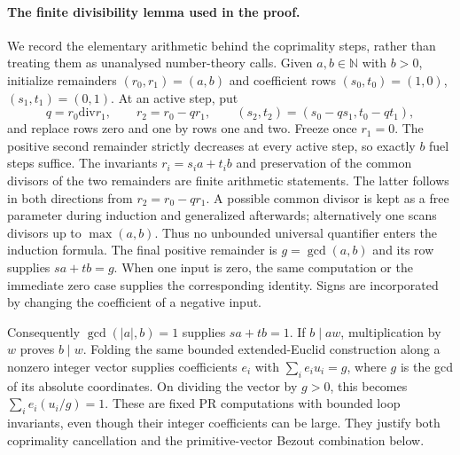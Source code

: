 \paragraph{The finite divisibility lemma used in the proof.}
We record the elementary arithmetic behind the coprimality steps, rather
than treating them as unanalysed number-theory calls. Given $a,b\in\mathbb N$
with $b>0$, initialize remainders $(r_0,r_1)=(a,b)$ and coefficient rows
$(s_0,t_0)=(1,0)$, $(s_1,t_1)=(0,1)$. At an active step, put
\[
 q=r_0\mathbin{\mathrm{div}}r_1,\qquad
 r_2=r_0-q r_1,\qquad
 (s_2,t_2)=(s_0-q s_1,t_0-q t_1),
\]
and replace rows zero and one by rows one and two. Freeze once $r_1=0$.
The positive second remainder strictly decreases at every active step,
so exactly $b$ fuel steps suffice. The invariants
$r_i=s_i a+t_i b$ and preservation of the common divisors of the two
remainders are finite arithmetic statements. The latter follows in both
directions from $r_2=r_0-q r_1$. A possible common divisor is kept as a
free parameter during induction and generalized afterwards; alternatively
one scans divisors up to $\max(a,b)$. Thus no unbounded universal
quantifier enters the induction formula. The final positive remainder is
$g=\gcd(a,b)$ and its row supplies $s a+t b=g$.
When one input is zero, the same computation or the immediate zero case
supplies the corresponding identity. Signs are incorporated by changing
the coefficient of a negative input.

Consequently $\gcd(|a|,b)=1$ supplies $s a+t b=1$. If $b\mid a w$,
multiplication by $w$ proves $b\mid w$. Folding the same bounded
extended-Euclid construction along a nonzero integer vector supplies
coefficients $e_i$ with $\sum_i e_i u_i=g$, where $g$ is the gcd of its
absolute coordinates. On dividing the vector by $g>0$, this becomes
$\sum_i e_i(u_i/g)=1$. These are fixed PR computations with bounded
loop invariants, even though their integer coefficients can be large.
They justify both coprimality cancellation and the primitive-vector
Bezout combination below.

